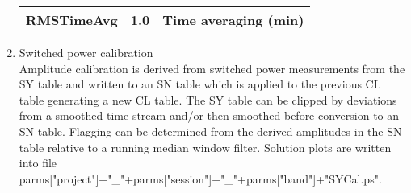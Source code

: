 \documentclass[11pt]{article}
\begin{document}
\begin{enumerate}
\begin{center}
\begin{tabular}{|l|c|l|}
RMSTimeAvg & 1.0  &  Time averaging (min)\\
\hline
\end{tabular}
\end{center}
%
\item Switched power calibration\\
Amplitude calibration is derived from switched power measurements from
the SY table and written to an SN table which is applied to the
previous CL table generating a new CL table.
The SY table can be clipped by deviations from a smoothed time stream
and/or then smoothed before conversion to an SN table.
Flagging can be determined from the derived amplitudes in the SN table
relative to a running median window filter.
Solution plots are written into file\\
parms["project"]+"\_"+parms["session"]+"\_"+parms["band"]+"SYCal.ps".


\end{enumerate}
\end{document}
